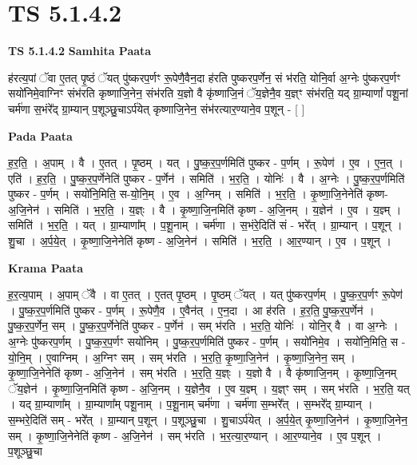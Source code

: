 \documentclass[17pt]{extarticle}
\begin{document}
\section{ TS 5.1.4.2 }

\textbf{TS 5.1.4.2 } \newline
\textbf{Samhita Paata} \newline

ह॑रत्य॒पां ॅवा ए॒तत् पृ॒ष्ठं ॅयत् पु॑ष्करप॒र्णꣳ रू॒पेणै॒वैन॒दा ह॑रति पुष्करप॒र्णेन॒ सं भ॑रति॒ योनि॒र्वा अ॒ग्नेः पु॑ष्करप॒र्णꣳ सयो॑निमे॒वाग्निꣳ संभ॑रति कृष्णाजि॒नेन॒ संभ॑रति य॒ज्ञो वै कृ॑ष्णाजि॒नं ॅय॒ज्ञेनै॒व य॒ज्ञ्ꣳ संभ॑रति॒ यद् ग्रा॒म्याणां᳚ पशू॒नां चर्म॑णा स॒भंरे᳚द् ग्रा॒म्यान् प॒शूञ्छु॒चाऽर्प॑येत् कृष्णाजि॒नेन॒ संभ॑रत्यार॒ण्याने॒व प॒शून् - [  ] \newline

\textbf{Pada Paata} \newline

ह॒र॒ति॒ । अ॒पाम् । वै । ए॒तत् । पृ॒ष्ठम् । यत् । पु॒ष्क॒र॒प॒र्णमिति॑ पुष्कर - प॒र्णम् । रू॒पेण॑ । ए॒व । ए॒न॒त् । एति॑ । ह॒र॒ति॒ । पु॒ष्क॒र॒प॒र्णेनेति॑ पुष्कर - प॒र्णेन॑ । समिति॑ । भ॒र॒ति॒ । योनिः॑ । वै । अ॒ग्नेः । पु॒ष्क॒र॒प॒र्णमिति॑ पुष्कर - प॒र्णम् । सयो॑नि॒मिति॒ स-यो॒नि॒म् । ए॒व । अ॒ग्निम् । समिति॑ । भ॒र॒ति॒ । कृ॒ष्णा॒जि॒नेनेति॑ कृष्ण-अ॒जि॒नेन॑ । समिति॑ । भ॒र॒ति॒ । य॒ज्ञ्ः । वै । कृ॒ष्णा॒जि॒नमिति॑ कृष्ण - अ॒जि॒नम् । य॒ज्ञेन॑ । ए॒व । य॒ज्ञ्म् । समिति॑ । भ॒र॒ति॒ । यत् । ग्रा॒म्याणा᳚म् । प॒शू॒नाम् । चर्म॑णा । स॒भंरे॒दिति॑ सं - भरे᳚त् । ग्रा॒म्यान् । प॒शून् । शु॒चा । अ॒र्प॒ये॒त् । कृ॒ष्णा॒जि॒नेनेति॑ कृष्ण - अ॒जि॒नेन॑ । समिति॑ । भ॒र॒ति॒ । आ॒र॒ण्यान् । ए॒व । प॒शून् ।  \newline


\textbf{Krama Paata} \newline

ह॒र॒त्य॒पाम् । अ॒पाम् ॅवै । वा ए॒तत् । ए॒तत् पृ॒ष्ठम् । पृ॒ष्ठम् ॅयत् । यत् पु॑ष्करप॒र्णम् । पु॒ष्क॒र॒प॒र्णꣳ रू॒पेण॑ । पु॒ष्क॒र॒प॒र्णमिति॑ पुष्कर - प॒र्णम् । रू॒पेणै॒व । ए॒वैन॑त् । ए॒न॒दा । आ ह॑रति । ह॒र॒ति॒ पु॒ष्क॒र॒प॒र्णेन॑ । पु॒ष्क॒र॒प॒र्णेन॒ सम् । पु॒ष्क॒र॒प॒र्णेनेति॑ पुष्कर - प॒र्णेन॑ । सम् भ॑रति । भ॒र॒ति॒ योनिः॑ । योनि॒र् वै । वा अ॒ग्नेः । अ॒ग्नेः पु॑ष्करप॒र्णम् । पु॒ष्क॒र॒प॒र्णꣳ सयो॑निम् । पु॒ष्क॒र॒प॒र्णमिति॑ पुष्कर - प॒र्णम् । सयो॑निमे॒व । सयो॑नि॒मिति॒ स - यो॒नि॒म् । ए॒वाग्निम् । अ॒ग्निꣳ सम् । 
सम् भ॑रति । भ॒र॒ति॒ कृ॒ष्णा॒जि॒नेन॑ । कृ॒ष्णा॒जि॒नेन॒ सम् । कृ॒ष्णा॒जि॒नेनेति॑ कृष्ण - अ॒जि॒नेन॑ । सम् भ॑रति । भ॒र॒ति॒ य॒ज्ञ्ः । य॒ज्ञो वै । वै कृ॑ष्णाजि॒नम् । कृ॒ष्णा॒जि॒नम् ॅय॒ज्ञेन॑ । कृ॒ष्णा॒जि॒नमिति॑ कृष्ण - अ॒जि॒नम् । य॒ज्ञेनै॒व । ए॒व य॒ज्ञ्म् । य॒ज्ञ्ꣳ सम् । सम् भ॑रति । भ॒र॒ति॒ यत् । यद् ग्रा॒म्याणा᳚म् । ग्रा॒म्याणा᳚म् पशू॒नाम् । प॒शू॒नाम् चर्म॑णा । चर्म॑णा स॒म्भरे᳚त् । स॒म्भरे᳚द् ग्रा॒म्यान् । स॒म्भरे॒दिति॑ सम् - भरे᳚त् । ग्रा॒म्यान् प॒शून् । प॒शूञ्छु॒चा । शु॒चाऽर्प॑येत् । अ॒र्प॒ये॒त् कृ॒ष्णा॒जि॒नेन॑ । कृ॒ष्णा॒जि॒नेन॒ सम् । कृ॒ष्णा॒जि॒नेनेति॑ कृष्ण - अ॒जि॒नेन॑ । 
सम् भ॑रति । भ॒र॒त्या॒र॒ण्यान् । आ॒र॒ण्याने॒व । ए॒व प॒शून् । 
प॒शूञ्छु॒चा \newline
\end{document}
